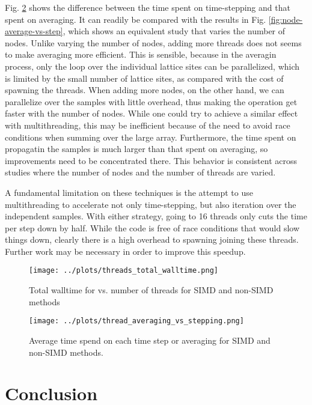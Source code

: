 \documentclass{article}
\begin{document}
Fig. \ref{fig:threads-averaging-vs-stepping} shows the difference between the time spent on time-stepping and 
that spent on averaging. It can readily be compared with the results in Fig. \ref{fig:node-average-vs-step}, which 
shows an equivalent study that varies the number of nodes. Unlike varying the number of nodes, adding more threads 
does not seems to make averaging more efficient. This is sensible, because in the averagin process, only 
the loop over the individual lattice sites can be parallelized, which is limited by the small number of lattice sites, 
as compared with the cost of spawning the threads. When adding more nodes, on the other hand, we can parallelize over
the samples with little overhead, thus making the operation get faster with the number of nodes. While one could 
try to achieve a similar effect with multithreading, this may be inefficient because of the need to avoid race 
conditions when summing over the large array. Furthermore, the time spent on propagatin the samples is much larger
than that spent on averaging, so improvements need to be concentrated there. This behavior is consistent across
studies where the number of nodes and the number of threads are varied.

A fundamental limitation on these techniques is the attempt to use multithreading to accelerate not only time-stepping,
but also iteration over the independent samples. With either strategy, going to 16 threads only cuts the time per step 
down by half. While the code is free of race conditions that would slow things down, clearly there is a high overhead 
to spawning joining these threads. Further work may be necessary in order to improve this speedup.


\begin{figure}
    \centering
    \texttt{[image: ../plots/threads\_total\_walltime.png]}
    \caption{Total walltime for vs. number of threads for SIMD and non-SIMD methods}
    \label{fig:threads-total-walltime}
\end{figure}

\begin{figure}
    \centering
    \texttt{[image: ../plots/thread\_averaging\_vs\_stepping.png]}
    \caption{Average time spend on each time step or averaging for SIMD and non-SIMD methods.}
    \label{fig:threads-averaging-vs-stepping}
\end{figure}


\section{Conclusion} \label{conclusion}
\end{document}
